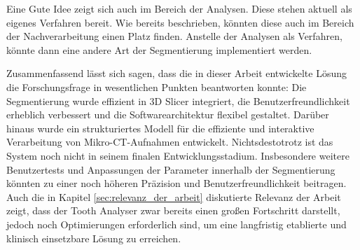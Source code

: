 Eine Gute Idee zeigt sich auch im Bereich der Analysen. Diese stehen aktuell als
eigenes Verfahren bereit. Wie bereits beschrieben, könnten diese auch im Bereich
der Nachverarbeitung einen Platz finden. Anstelle der Analysen als Verfahren, könnte
dann eine andere Art der Segmentierung implementiert werden.

Zusammenfassend lässt sich sagen, dass die in dieser Arbeit entwickelte Lösung
die Forschungsfrage in wesentlichen Punkten beantworten konnte: Die Segmentierung
wurde effizient in 3D Slicer integriert, die Benutzerfreundlichkeit erheblich
verbessert und die Softwarearchitektur flexibel gestaltet. Darüber hinaus wurde ein
strukturiertes Modell für die effiziente und interaktive Verarbeitung von Mikro-\ac{CT}-Aufnahmen
entwickelt. Nichtsdestotrotz ist das System noch nicht in seinem finalen Entwicklungsstadium.
Insbesondere weitere Benutzertests und Anpassungen der Parameter innerhalb der
Segmentierung könnten zu einer noch höheren Präzision und Benutzerfreundlichkeit
beitragen. Auch die in Kapitel \ref{sec:relevanz_der_arbeit} diskutierte Relevanz
der Arbeit zeigt, dass der Tooth Analyser zwar bereits einen großen Fortschritt
darstellt, jedoch noch Optimierungen erforderlich sind, um eine langfristig
etablierte und klinisch einsetzbare Lösung zu erreichen.
